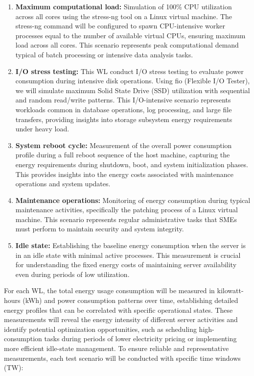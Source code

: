 \begin{enumerate}[label=WL\arabic*]
    \item \textbf{Maximum computational load:} Simulation of 100\% CPU utilization across all
    cores using the stress-ng tool on a Linux virtual machine. The stress-ng
    command will be configured to spawn CPU-intensive worker processes equal to
    the number of available virtual CPUs, ensuring maximum load across all cores.
    This scenario represents peak computational demand typical of batch processing
    or intensive data analysis tasks. \cite{stressng2020}

    \item \textbf{I/O stress testing:} This WL conduct I/O stress testing to evaluate
    power consumption during intensive disk operations. Using fio (Flexible I/O Tester),
    we will simulate maximum Solid State Drive (SSD) utilization with sequential and random read/write
    patterns. This I/O-intensive scenario represents workloads common in database operations,
    log processing, and large file transfers, providing insights into storage
    subsystem energy requirements under heavy load.

    \item \textbf{System reboot cycle:} Measurement of the overall power consumption profile
    during a full reboot sequence of the host machine, capturing the energy
    requirements during shutdown, boot, and system initialization phases. This
    provides insights into the energy costs associated with maintenance operations
    and system updates.

    \item \textbf{Maintenance operations:} Monitoring of energy consumption during typical
    maintenance activities, specifically the patching process of a Linux virtual
    machine. This scenario represents regular administrative tasks that SMEs must
    perform to maintain security and system integrity.

    \item \textbf{Idle state:} Establishing the baseline energy consumption when the server is
    in an idle state with minimal active processes. This measurement is crucial
    for understanding the fixed energy costs of maintaining server availability
    even during periods of low utilization. \cite{moran2024dissecting,agilewatts2022}
\end{enumerate}

For each WL, the total energy usage consumption will be measured in kilowatt-hours (kWh) and power
consumption patterns over time, establishing detailed energy profiles that can be
correlated with specific operational states. These measurements will reveal the
energy intensity of different server activities and identify potential
optimization opportunities, such as scheduling high-consumption tasks during
periods of lower electricity pricing or implementing more efficient idle-state
management.
\newpage
To ensure reliable and representative measurements, each test scenario will be
conducted with specific time windows (TW):

